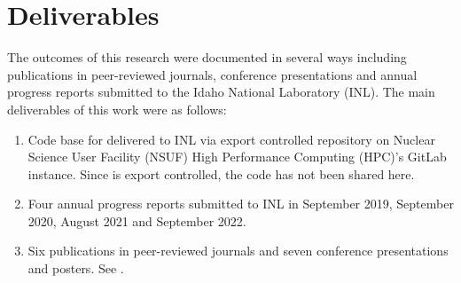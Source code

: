 \section{Deliverables}
	The outcomes of this research were documented in several ways including publications in peer-reviewed journals, conference presentations and annual progress reports submitted to the Idaho National Laboratory (INL). The main deliverables of this work were as follows:
	\begin{enumerate}
	\item Code base for {\GEM} delivered to INL via export controlled repository on Nuclear Science User Facility (NSUF) High Performance Computing (HPC)'s GitLab instance. Since {\YJ} is export controlled, the code has not been shared here.
	\item Four annual progress reports submitted to INL in September 2019, September 2020, August 2021 and September 2022. 
	\item Six publications in peer-reviewed journals and seven conference presentations and posters. See .
	\end{enumerate}
	